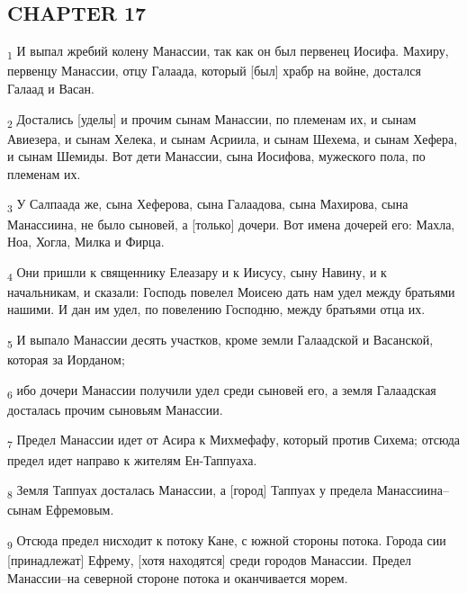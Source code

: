 \subsection{CHAPTER 17}
\begin{tcolorbox}
\textsubscript{1} И выпал жребий колену Манассии, так как он был первенец Иосифа. Махиру, первенцу Манассии, отцу Галаада, который [был] храбр на войне, достался Галаад и Васан.
\end{tcolorbox}
\begin{tcolorbox}
\textsubscript{2} Достались [уделы] и прочим сынам Манассии, по племенам их, и сынам Авиезера, и сынам Хелека, и сынам Асриила, и сынам Шехема, и сынам Хефера, и сынам Шемиды. Вот дети Манассии, сына Иосифова, мужеского пола, по племенам их.
\end{tcolorbox}
\begin{tcolorbox}
\textsubscript{3} У Салпаада же, сына Хеферова, сына Галаадова, сына Махирова, сына Манассиина, не было сыновей, а [только] дочери. Вот имена дочерей его: Махла, Ноа, Хогла, Милка и Фирца.
\end{tcolorbox}
\begin{tcolorbox}
\textsubscript{4} Они пришли к священнику Елеазару и к Иисусу, сыну Навину, и к начальникам, и сказали: Господь повелел Моисею дать нам удел между братьями нашими. И дан им удел, по повелению Господню, между братьями отца их.
\end{tcolorbox}
\begin{tcolorbox}
\textsubscript{5} И выпало Манассии десять участков, кроме земли Галаадской и Васанской, которая за Иорданом;
\end{tcolorbox}
\begin{tcolorbox}
\textsubscript{6} ибо дочери Манассии получили удел среди сыновей его, а земля Галаадская досталась прочим сыновьям Манассии.
\end{tcolorbox}
\begin{tcolorbox}
\textsubscript{7} Предел Манассии идет от Асира к Михмефафу, который против Сихема; отсюда предел идет направо к жителям Ен-Таппуаха.
\end{tcolorbox}
\begin{tcolorbox}
\textsubscript{8} Земля Таппуах досталась Манассии, а [город] Таппуах у предела Манассиина--сынам Ефремовым.
\end{tcolorbox}
\begin{tcolorbox}
\textsubscript{9} Отсюда предел нисходит к потоку Кане, с южной стороны потока. Города сии [принадлежат] Ефрему, [хотя находятся] среди городов Манассии. Предел Манассии--на северной стороне потока и оканчивается морем.
\end{tcolorbox}
